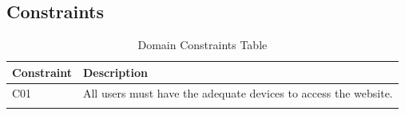 \pagebreak

\subsection{Constraints}
\label{sub:constraints}%

\begin{longtable}{|l|p{}|}
      \hline
      \textbf{Constraint} & \textbf{Description}                                            \\
      \hline
      C01                 & All users must have the adequate devices to access the website. \\
      \hline

      \caption{Domain Constraints Table}
      \label{tab:domain_constraints}
\end{longtable}
